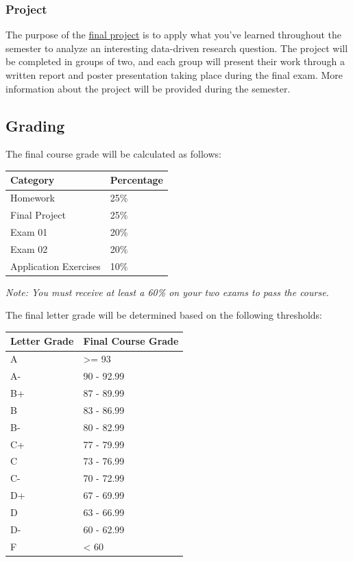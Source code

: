 \documentclass[
  letterpaper,
  DIV=11,
  numbers=noendperiod]{scrartcl}
\begin{document}
\subsubsection{Project}\label{project}

The purpose of the \href{./project/project-instructions.qmd}{final
project} is to apply what you've learned throughout the semester to
analyze an interesting data-driven research question. The project will
be completed in groups of two, and each group will present their work
through a written report and poster presentation taking place during the
final exam. More information about the project will be provided during
the semester.

\subsection{Grading}\label{grading}

The final course grade will be calculated as follows:

\begin{longtable}[]{@{}ll@{}}
\toprule\noalign{}
Category & Percentage \\
\midrule\noalign{}
\endhead
\bottomrule\noalign{}
\endlastfoot
Homework & 25\% \\
Final Project & 25\% \\
Exam 01 & 20\% \\
Exam 02 & 20\% \\
Application Exercises & 10\% \\
\end{longtable}

\emph{Note: You must receive at least a 60\% on your two exams to pass
the course.}

The final letter grade will be determined based on the following
thresholds:

\begin{longtable}[]{@{}ll@{}}
\toprule\noalign{}
Letter Grade & Final Course Grade \\
\midrule\noalign{}
\endhead
\bottomrule\noalign{}
\endlastfoot
A & \textgreater= 93 \\
A- & 90 - 92.99 \\
B+ & 87 - 89.99 \\
B & 83 - 86.99 \\
B- & 80 - 82.99 \\
C+ & 77 - 79.99 \\
C & 73 - 76.99 \\
C- & 70 - 72.99 \\
D+ & 67 - 69.99 \\
D & 63 - 66.99 \\
D- & 60 - 62.99 \\
F & \textless{} 60 \\
\end{longtable}
\end{document}
